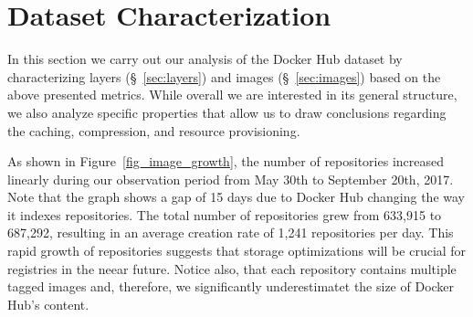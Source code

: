 \section{Dataset Characterization}
\label{sec:char}

In this section we carry out our analysis of the Docker Hub dataset by characterizing
layers (\S~\ref{sec:layers}) and images (\S~\ref{sec:images}) based on
the above presented metrics. While overall we are interested in its general structure,
we also analyze specific properties that allow us to draw conclusions regarding the
caching, compression, and resource provisioning.

As shown in Figure~\ref{fig_image_growth}, the number of repositories increased
linearly during our observation period from May 30th to September 20th,
2017. Note that the graph shows a gap of 15 days due to Docker Hub changing the way it
indexes repositories. The total number of repositories
grew from 633,915 to 687,292, resulting in an average creation rate of 1,241
repositories per day.
This rapid growth of repositories suggests that storage optimizations will
be crucial for registries in the neear future.
Notice also,
that each repository contains multiple tagged images and, therefore, we 
significantly underestimatet the size of Docker Hub's content.

%


